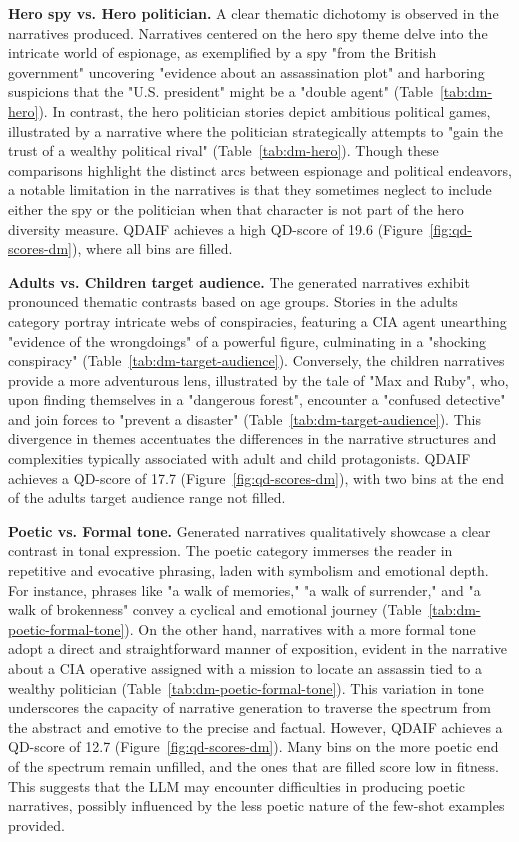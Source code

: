 \textbf{Hero spy vs. Hero politician.} A clear thematic dichotomy is observed in the narratives produced. Narratives centered on the hero spy theme delve into the intricate world of espionage, as exemplified by a spy "from the British government" uncovering "evidence about an assassination plot" and harboring suspicions that the "U.S. president" might be a "double agent" (Table~\ref{tab:dm-hero}). In contrast, the hero politician stories depict ambitious political games, illustrated by a narrative where the politician strategically attempts to "gain the trust of a wealthy political rival" (Table~\ref{tab:dm-hero}). 
Though these comparisons highlight the distinct arcs between espionage and political endeavors, a notable limitation in the narratives is that they sometimes neglect to include either the spy or the politician when that character is not part of the hero diversity measure. QDAIF achieves a high QD-score of 19.6 (Figure~\ref{fig:qd-scores-dm}), where all bins are filled.

\textbf{Adults vs. Children target audience.} The generated narratives exhibit pronounced thematic contrasts based on age groups. Stories in the adults category portray intricate webs of conspiracies, featuring a CIA agent unearthing "evidence of the wrongdoings" of a powerful figure, culminating in a "shocking conspiracy" (Table~\ref{tab:dm-target-audience}). Conversely, the children narratives provide a more adventurous lens, illustrated by the tale of "Max and Ruby", who, upon finding themselves in a "dangerous forest", encounter a "confused detective" and join forces to "prevent a disaster" (Table~\ref{tab:dm-target-audience}). This divergence in themes accentuates the differences in the narrative structures and complexities typically associated with adult and child protagonists. QDAIF achieves a QD-score of 17.7 (Figure~\ref{fig:qd-scores-dm}), with two bins at the end of the adults target audience range not filled.

\textbf{Poetic vs. Formal tone.} Generated narratives qualitatively showcase a clear contrast in tonal expression. The poetic category immerses the reader in repetitive and evocative phrasing, laden with symbolism and emotional depth. For instance, phrases like "a walk of memories," "a walk of surrender," and "a walk of brokenness" convey a cyclical and emotional journey (Table~\ref{tab:dm-poetic-formal-tone}). On the other hand, narratives with a more formal tone adopt a direct and straightforward manner of exposition, evident in the narrative about a CIA operative assigned with a mission to locate an assassin tied to a wealthy politician (Table~\ref{tab:dm-poetic-formal-tone}). This variation in tone underscores the capacity of narrative generation to traverse the spectrum from the abstract and emotive to the precise and factual. However, QDAIF achieves a QD-score of 12.7 (Figure~\ref{fig:qd-scores-dm}). Many bins on the more poetic end of the spectrum remain unfilled, and the ones that are filled score low in fitness. This suggests that the LLM may encounter difficulties in producing poetic narratives, possibly influenced by the less poetic nature of the few-shot examples provided.

